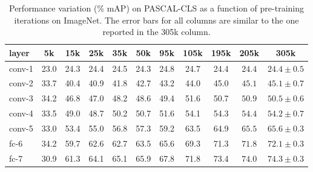 \setlength{\tabcolsep}{4pt}
\begin{table}[t!]
\begin{center}
\caption{Performance variation (\% mAP) on PASCAL-CLS as a function of pre-training iterations on ImageNet. The error bars  for all columns are similar to the one reported in the 305k column.}
\label{table:det-traj-classify}
\vspace{0.3em}
\begin{tabular}{lcccccccccc}
layer  & 5k & 15k & 25k & 35k & 50k & 95k & 105k & 195k & 205k & 305k \\
\hline
conv-1 & 23.0 & 24.3 & 24.4 & 24.5 & 24.3 & 24.8 & 24.7 & 24.4 & $24.4$  & $24.4 \pm 0.5$ \\
conv-2 & 33.7 & 40.4 & 40.9 & 41.8 & 42.7 & 43.2 & 44.0 & 45.0 & $45.1$  & $45.1 \pm 0.7$ \\
conv-3 & 34.2 & 46.8 & 47.0 & 48.2 & 48.6 & 49.4 & 51.6 & 50.7 & $50.9$  & $50.5 \pm 0.6$ \\
conv-4 & 33.5 & 49.0 & 48.7 & 50.2 & 50.7 & 51.6 & 54.1 & 54.3 & $54.4$  & $54.2 \pm 0.7$ \\
conv-5 & 33.0 & 53.4 & 55.0 & 56.8 & 57.3 & 59.2 & 63.5 & 64.9 & $65.5$  & $65.6 \pm 0.3 $ \\
fc-6   & 34.2 & 59.7 & 62.6 & 62.7 & 63.5 & 65.6 & 69.3 & 71.3 & $71.8$  & $72.1 \pm 0.3 $\\
fc-7   & 30.9 & 61.3 & 64.1 & 65.1 & 65.9 & 67.8 & 71.8 & 73.4 & $74.0$  & $74.3 \pm 0.3 $\\
\end{tabular}
\end{center}
\end{table}
\setlength{\tabcolsep}{1.4pt}

\setlength{\tabcolsep}{4pt}
\begin{table}[t!]
\begin{center}
\caption{Performance variation on SUN-CLS and PASCAL-DET using features from a CNN pre-trained for different number of iterations and fine-tuned for a fixed number of iterations (40k for SUN-CLS and 70k for PASCAL-DET)}
\label{table:det-trajectory}
\vspace{0.3em}
\end{center}
\end{table}
\setlength{\tabcolsep}{1.4pt}

